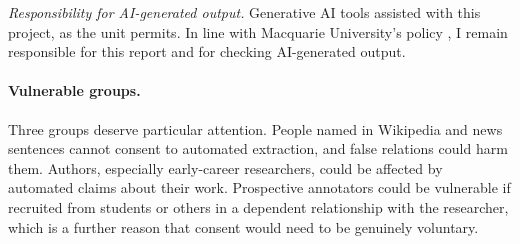 \emph{Responsibility for AI-generated output.} Generative AI tools assisted with this project, as the unit permits. In line with Macquarie University's policy \citep{mq-ai-policy}, I remain responsible for this report and for checking AI-generated output.

\paragraph{Vulnerable groups.} Three groups deserve particular attention. People named in Wikipedia and news sentences cannot consent to automated extraction, and false relations could harm them. Authors, especially early-career researchers, could be affected by automated claims about their work. Prospective annotators could be vulnerable if recruited from students or others in a dependent relationship with the researcher, which is a further reason that consent would need to be genuinely voluntary.
